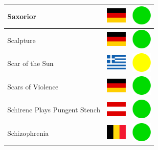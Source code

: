 \documentclass[12pt, a4paper, twoside]{report}
\begin{document}
\begin{center}
\begin{longtable}{|p{5cm}|p{2cm}|p{2cm}|}
 Saxorior                                                   & \includegraphics[width=1cm]{../img/flags/de} &   \includegraphics[width=1cm]{../likes/y} \\ \hline
 Scalpture                                                  & \includegraphics[width=1cm]{../img/flags/de} &   \includegraphics[width=1cm]{../likes/y} \\ \hline
 Scar of the Sun                                            & \includegraphics[width=1cm]{../img/flags/gr} &   \includegraphics[width=1cm]{../likes/m} \\ \hline
 Scars of Violence                                          & \includegraphics[width=1cm]{../img/flags/de} &   \includegraphics[width=1cm]{../likes/y} \\ \hline
 Schirenc Plays Pungent Stench                              & \includegraphics[width=1cm]{../img/flags/at} &   \includegraphics[width=1cm]{../likes/y} \\ \hline
 Schizophrenia                                              & \includegraphics[width=1cm]{../img/flags/be} &   \includegraphics[width=1cm]{../likes/y} \\ \hline

\end{longtable}
\end{center}
\end{document}
